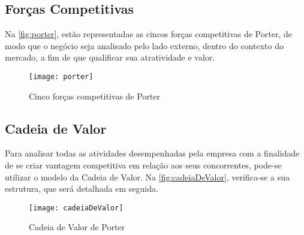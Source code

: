 \subsection{Forças Competitivas}

Na \autoref{fig:porter}, estão representadas as cincos forças competitivas de Porter, de modo que o negócio seja analisado pelo lado externo, dentro do contexto do mercado, a fim de que qualificar sua atratividade e valor.

\begin{figure}[H]
	\caption{\label{fig:porter}Cinco forças competitivas de Porter}
	\begin{center}
	    \texttt{[image: porter]}
	\end{center}
\end{figure}

\subsection{Cadeia de Valor}

Para analisar todas as atividades desempenhadas pela empresa com a finalidade de se criar vantagem competitiva em relação aos seus concorrentes, pode-se utilizar o modelo da Cadeia de Valor. Na \autoref{fig:cadeiaDeValor}, verifica-se a sua estrutura, que será detalhada em seguida.

\begin{figure}[H]
	\caption{\label{fig:cadeiaDeValor}Cadeia de Valor de Porter}
	\begin{center}
	    \texttt{[image: cadeiaDeValor]}
	\end{center}
\end{figure}

